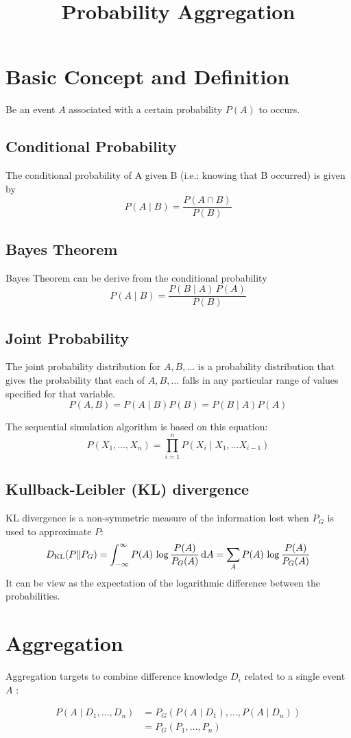 \documentclass[twocolumn]{article}
\title{Probability Aggregation}
\date{\vspace{-6ex}}
\numberwithin{equation}{section}
\begin{document}
\maketitle


\section{Basic Concept and Definition}
Be an event $A$ associated with a certain probability $P(A)$ to occurs.

	\subsection{Conditional Probability}
The conditional probability of A given B (i.e.: knowing that B occurred) is given by 
$$P(A \mid B)= \frac{P(A \cap B)}{P(B)}$$

	\subsection{Bayes Theorem}
Bayes Theorem can be derive from the conditional probability 
$$P(A \mid B) = \frac{P(B \mid  A)\, P(A)}{P(B)} $$

	\subsection{Joint Probability}
The joint probability distribution for $A,B,\ldots$ is a probability distribution that gives the probability that each of $A,B,\ldots$ falls in any particular range of values specified for that variable.
$$P(A,B)=P(A \mid B) P(B)=P(B \mid A) P(A)$$

The sequential simulation algorithm is based on this equation:
$$P(X_1,\ldots,X_n) = \prod_{i=1}^n  P(X_i \mid X_1, \ldots X_{i-1}) $$

	\subsection{Kullback-Leibler (KL) divergence}
KL divergence is a non-symmetric measure of the information lost when $P_G$ is used to approximate $P$:
$$D_{\mathrm{KL}}(P\|P_G) = \int_{-\infty}^\infty P(A) \, \log\frac{P(A)}{P_G(A)} \, {\rm d}A =\sum_A P(A) \, \log\frac{P(A)}{P_G(A)}$$
It can be view as the expectation of the logarithmic difference between the probabilities.

\section{Aggregation}
Aggregation targets to combine difference knowledge $D_i$ related to a single event $A$ :
\begin{framed}
\begin{align*} 
P(A \mid D_1,\ldots,D_n)	&= P_G\left(P(A \mid D_1), \ldots, P(A \mid D_n)\right)\\ 
						&= P_G\left(P_1, \ldots, P_n \right)
\end{align*}
\end{framed}
\end{document}
